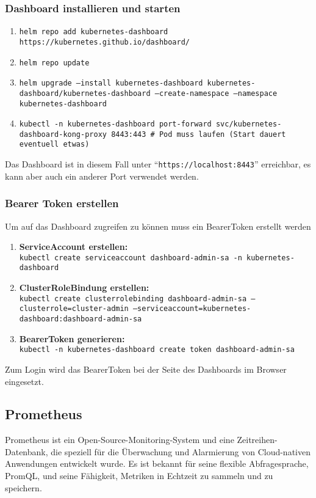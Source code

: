 \subsubsection{Dashboard installieren und starten}
\begin{enumerate}
    \item \texttt{helm repo add kubernetes-dashboard https://kubernetes.github.io/dashboard/}
    \item  \texttt{helm repo update}
    \item \texttt{helm upgrade --install kubernetes-dashboard kubernetes-dashboard/kubernetes-dashboard --create-namespace --namespace kubernetes-dashboard}
    \item \texttt{kubectl -n kubernetes-dashboard port-forward svc/kubernetes-dashboard-kong-proxy 8443:443 \# Pod muss laufen (Start dauert eventuell etwas)}
\end{enumerate}
Das Dashboard ist in diesem Fall unter \enquote{\texttt{https://localhost:8443}} erreichbar, es kann aber auch ein anderer Port verwendet werden.
\subsubsection{Bearer Token erstellen}
Um auf das Dashboard zugreifen zu können muss ein BearerToken erstellt werden
\begin{enumerate}
    \item \textbf{ServiceAccount erstellen:}\\ \texttt{kubectl create serviceaccount dashboard-admin-sa -n kubernetes-dashboard}
    \item \textbf{ClusterRoleBindung erstellen:}\\ \texttt{kubectl create clusterrolebinding dashboard-admin-sa --clusterrole=cluster-admin --serviceaccount=kubernetes-dashboard:dashboard-admin-sa}
    \item \textbf{BearerToken generieren:}\\ \texttt{kubectl -n kubernetes-dashboard create token dashboard-admin-sa}
\end{enumerate}
Zum Login wird das BearerToken bei der Seite des Dashboards im Browser eingesetzt.
\subsection{Prometheus}
Prometheus ist ein Open-Source-Monitoring-System und eine Zeitreihen-Datenbank, die speziell für die Überwachung und Alarmierung von Cloud-nativen Anwendungen entwickelt wurde. Es ist bekannt für seine flexible Abfragesprache, PromQL, und seine Fähigkeit, Metriken in Echtzeit zu sammeln und zu speichern.


